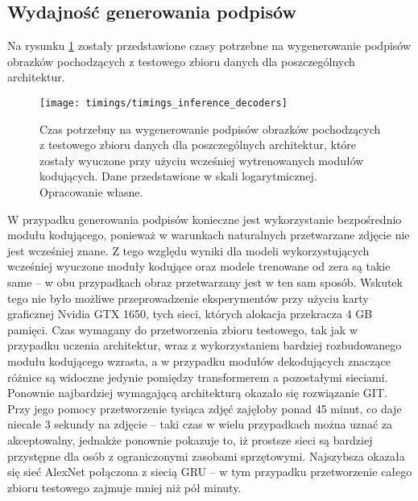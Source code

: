 \subsection{Wydajność generowania podpisów}
Na rysunku \ref{fig:timings-decoders-inference} zostały przedstawione czasy potrzebne na wygenerowanie podpisów obrazków pochodzących z testowego zbioru danych dla poszczególnych architektur.
\begin{figure}[H]
    \centering
    \texttt{[image: timings/timings\_inference\_decoders]}
    \caption{Czas potrzebny na wygenerowanie podpisów obrazków pochodzących z testowego zbioru danych dla poszczególnych architektur, które zostały wyuczone przy użyciu wcześniej wytrenowanych modułów kodujących. Dane przedstawione w skali logarytmicznej. Opracowanie własne.}
    \label{fig:timings-decoders-inference}
\end{figure}
\noindent W przypadku generowania podpisów konieczne jest wykorzystanie bezpośrednio modułu kodującego, ponieważ w warunkach naturalnych przetwarzane zdjęcie nie jest wcześniej znane. Z tego względu wyniki dla modeli wykorzystujących wcześniej wyuczone moduły kodujące oraz modele trenowane od zera są takie same -- w obu przypadkach obraz przetwarzany jest w ten sam sposób. Wskutek tego nie było możliwe przeprowadzenie eksperymentów przy użyciu karty graficznej Nvidia GTX 1650, tych sieci, których alokacja przekracza 4 GB pamięci. Czas wymagany do przetworzenia zbioru testowego, tak jak w przypadku uczenia architektur, wraz z wykorzystaniem bardziej rozbudowanego modułu kodującego wzrasta, a w przypadku modułów dekodujących znaczące różnice są widoczne jedynie pomiędzy transformerem a pozostałymi sieciami. Ponownie najbardziej wymagającą architekturą okazało się rozwiązanie GIT. Przy jego pomocy przetworzenie tysiąca zdjęć zajęłoby ponad 45 minut, co daje niecałe 3 sekundy na zdjęcie -- taki czas w wielu przypadkach można uznać za akceptowalny, jednakże ponownie pokazuje to, iż prostsze sieci są bardziej przystępne dla osób z ograniczonymi zasobami sprzętowymi. Najszybsza okazała się sieć AlexNet połączona z siecią GRU -- w tym przypadku przetworzenie całego zbioru testowego zajmuje mniej niż pół minuty.

